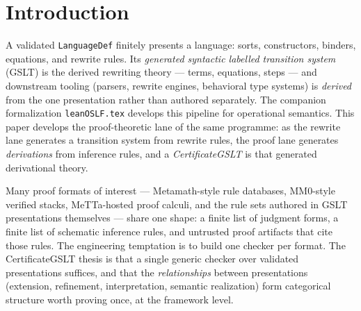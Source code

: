 \documentclass[]{article}
\theoremstyle{remark}
\newcommand{\code}[1]{\texttt{#1}}
\newcommand{\GSLT}{\textup{GSLT}}
\newcommand{\CertificateGSLT}{\textup{CertificateGSLT}}
\begin{document}
\begin{abstract}
whose gate conditions carries a compiled counterexample showing the direct
translation fails without it; a versioned chronological-article wire
semantics with round-trip, canonicality, digest-identity, exact
checker-correspondence, and conservative-evolution theorems, plus a compiled
mutation battery; a genuine
fixed-core binary coproduct of rule theories; exact certificate lower bounds
with budget monotonicity; and the two orders of Belnap's four evidence
statuses.  These results are stated at their proved scope: the adequate
trace fragment is sufficient rather than maximal, the article version names
the artifact grammar rather than its presentation, and the development does
not claim a literal arithmetical-hierarchy classification, Patterson's full
constructible-duality logic, or a colimit of all languages.
\end{abstract}

\section{Introduction}
\label{sec:intro}

A validated \code{LanguageDef} finitely presents a language: sorts,
constructors, binders, equations, and rewrite rules.  Its \emph{generated
syntactic labelled transition system} (\GSLT{}) is the derived rewriting
theory --- terms, equations, steps --- and downstream tooling (parsers,
rewrite engines, behavioral type systems) is \emph{derived} from the one
presentation rather than authored separately.  The companion formalization
\code{leanOSLF.tex} develops this pipeline for operational semantics.  This
paper develops the proof-theoretic lane of the same programme: as the
rewrite lane generates a transition system from rewrite rules, the proof
lane generates \emph{derivations} from inference rules, and a
\emph{\CertificateGSLT{}} is that generated derivational theory.

Many proof formats of interest --- Metamath-style rule databases, MM0-style
verified stacks, MeTTa-hosted proof calculi, and the rule sets authored in
\GSLT{} presentations themselves --- share one shape: a finite list of
judgment forms, a finite list of schematic inference rules, and untrusted
proof artifacts that cite those rules.  The engineering temptation is to
build one checker per format.  The \CertificateGSLT{} thesis is that a single
generic checker over validated presentations suffices, and that the
\emph{relationships} between presentations (extension, refinement,
interpretation, semantic realization) form categorical structure worth
proving once, at the framework level.
\end{document}
